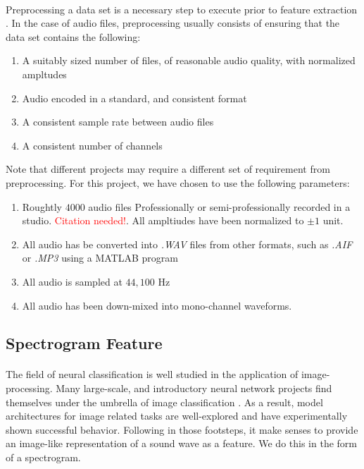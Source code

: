 \documentclass[12pt,letterpaper]{article}
\begin{document}
\paragraph*{}Preprocessing a data set is a necessary step to execute prior to feature extraction \cite{Geron2,James}. In the case of audio files, preprocessing usually consists of ensuring that the data set contains the following:
\begin{enumerate}
\item A suitably sized number of files, of reasonable audio quality, with normalized ampltudes
\item Audio encoded in a standard, and consistent format
\item A consistent sample rate between audio files
\item A consistent number of channels
\end{enumerate}
Note that different projects may require a different set of requirement from preprocessing\cite{Virtanen}. For this project, we have chosen to use the following parameters:
\begin{enumerate}
\item Roughtly $4000$ audio files Professionally or semi-professionally recorded in a studio. \textcolor{red}{Citation needed!}. All ampltiudes have been normalized to $\pm 1$ unit.
\item All audio has be converted into \textit{.WAV} files from other formats, such as \textit{.AIF} or \textit{.MP3} using a MATLAB program
\item All audio is sampled at $44,100$ Hz
\item All audio has been down-mixed into mono-channel waveforms.
\end{enumerate}


\newpage

\subsection{Spectrogram Feature}
\label{subsec-spectrogram}

\paragraph*{}The field of neural classification is well studied in the application of image-processing. Many large-scale, and introductory neural network projects find themselves under the umbrella of image classification \cite{Geron,Goodfellow,Loy,Mierswa}. As a result, model architectures for image related tasks are well-explored and have experimentally shown successful behavior. Following in those footsteps, it make senses to provide an image-like representation of a sound wave as a feature. We do this in the form of a spectrogram.
\end{document}
